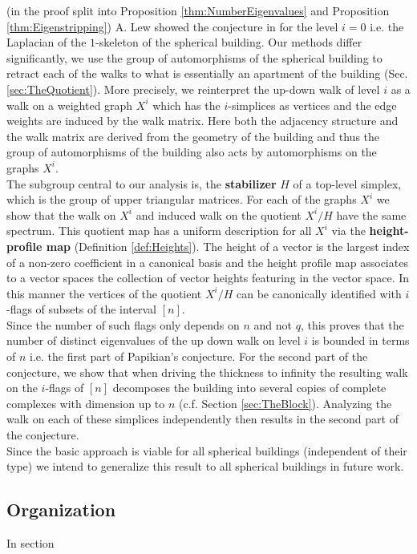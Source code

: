\documentclass[11pt]{amsart}
\begin{document}
    (in the proof split into  Proposition \ref{thm:NumberEigenvalues} and Proposition \ref{thm:Eigenstripping}) 
    A. Lew showed the conjecture in \cite{Lew23} for the level $i=0$ i.e. the Laplacian of the $1$-skeleton of the spherical building. Our methods differ significantly, we use the group of automorphisms of the spherical building to retract each of the walks to what is essentially an apartment of the building (Sec. \ref{sec:TheQuotient}). More precisely, we reinterpret the up-down walk of level $i$ as a walk on a weighted graph $X^i$ which has the $i$-simplices as vertices and the edge weights are induced by the walk matrix. Here both the adjacency structure and the walk matrix are derived from the geometry of the building and thus the group of automorphisms of the building also acts by automorphisms on the graphs $X^i$.\\ 
    The subgroup central to our analysis is, the \textbf{stabilizer} $H$ of a top-level simplex, which is the group of upper triangular matrices. For each of the graphs $X^i$ we show that the walk on $X^i$ and induced walk on the quotient $X^i/H$ have the same spectrum. This quotient map has a uniform description for all $X^i$ via the \textbf{height-profile map} (Definition \ref{def:Heights}). The height of a vector is the largest index of a non-zero coefficient in a canonical basis and the height profile map associates to a vector spaces the collection of vector heights featuring in the vector space. In this manner the vertices of the quotient $X^i/H$ can be canonically identified with $i$-flags of subsets of the interval $[n]$.\\   Since the number of such flags only depends on $n$ and not $q$, this proves that the number of distinct eigenvalues of the up down walk on level $i$ is bounded in terms of $n$ i.e. the first part of Papikian's conjecture. For the second part of the conjecture, we show that when driving the thickness to infinity the resulting walk on the $i$-flags of $[n]$ decomposes the building into several copies of complete complexes with dimension up to $n$ (c.f. Section \ref{sec:TheBlock}). Analyzing the walk on each of these simplices independently then results in the second part of the conjecture.\\
    Since the basic approach is viable for all spherical buildings (independent of their type) we intend to generalize this result to all spherical buildings in future work. 

    \subsection*{Organization} In section 
\end{document}
